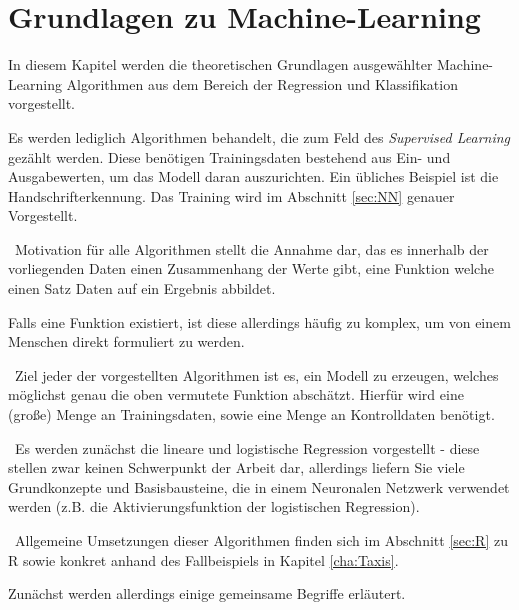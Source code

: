 \chapter{Grundlagen zu Machine-Learning}
\label{cha:MachineLearning}
\label{cha:Theorie}
In diesem Kapitel werden die theoretischen Grundlagen ausgewählter Machine-Learning Algorithmen aus dem Bereich der Regression und Klassifikation vorgestellt. 

Es werden lediglich Algorithmen behandelt, die zum Feld des \textit{Supervised Learning} gezählt werden. Diese benötigen Trainingsdaten bestehend aus Ein- und Ausgabewerten, um das Modell daran auszurichten. Ein übliches Beispiel ist die Handschrifterkennung. Das Training wird im Abschnitt \ref{sec:NN} genauer Vorgestellt. 

~\newline Motivation für alle Algorithmen stellt die Annahme dar, das es innerhalb der vorliegenden Daten einen Zusammenhang der Werte gibt, eine Funktion welche einen Satz Daten auf ein Ergebnis abbildet. 

Falls eine Funktion existiert, ist diese allerdings häufig zu komplex, um von einem Menschen direkt formuliert zu werden.   

~\newline Ziel jeder der vorgestellten Algorithmen ist es, ein Modell zu erzeugen, welches möglichst genau die oben vermutete Funktion abschätzt. Hierfür wird eine (große) Menge an Trainingsdaten, sowie eine Menge an Kontrolldaten benötigt.

~\newline Es werden zunächst die lineare und logistische Regression vorgestellt - diese stellen zwar keinen Schwerpunkt der Arbeit dar, allerdings liefern Sie viele Grundkonzepte und Basisbausteine, die in einem Neuronalen Netzwerk verwendet werden (z.B. die Aktivierungsfunktion der logistischen Regression).    

~\newline Allgemeine Umsetzungen dieser Algorithmen finden sich im Abschnitt \ref{sec:R} zu R sowie konkret anhand des Fallbeispiels in Kapitel \ref{cha:Taxis}. 

Zunächst werden allerdings einige gemeinsame Begriffe erläutert. 



